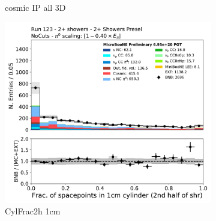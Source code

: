 \begin{figure}[H]
\begin{subfigure}{0.3\textwidth}
    \caption{cosmic IP all 3D}
    \end{subfigure}
    \begin{subfigure}{0.3\textwidth}
    \includegraphics[width=1.0\textwidth]{Sidebands/Figures/TwoShr_1e0pSel/Presel/CylFrac2h_1cm.pdf}
    \caption{CylFrac2h 1cm}
    \end{subfigure}
    \caption{} 
    \label{fig:HE_1eNp_1}
\end{figure}

